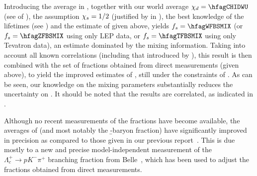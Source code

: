 Introducing the \chibar average in , together with our world average 
$\chid = \hfagCHIDWU$ (see  of ), the assumption $\chi_{s}= 1/2$ 
(justified by  in ), the 
best knowledge of the lifetimes (see ) and the estimate of \fbb given above, 
yields $\fBs = \hfagWFBSMIX$ 
(or $\fBs = \hfagZFBSMIX$ using only LEP data, 
or $\fBs = \hfagTFBSMIX$ using only Tevatron data),
an estimate dominated by the mixing information. 
Taking into account all known correlations (including that introduced by \fbb), 
this result is then combined with the set of fractions obtained from direct measurements 
(given above), to yield the %
improved estimates of , 
still under the constraints of .
As can be seen, our knowledge on the mixing parameters 
substantially reduces the uncertainty on \fBs.
It should be noted that the results %
are correlated, as indicated in .

Although no recent measurements of the fractions have become available, 
the averages of  (and most notably the \b-baryon fraction) 
have significantly improved in precision as compared to those given in our 
previous report~\cite{Amhis:2012bh}. This is due mostly to a new and precise 
model-independent measurement of the $\Lambda_c^+ \to p K^-\pi^+$
branching fraction from Belle~\cite{Zupanc:2013iki}, 
which has been used to adjust the fractions obtained from direct measurements. 




